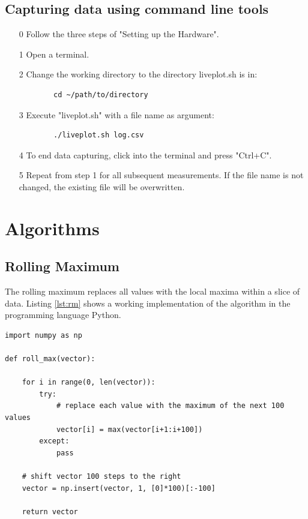 \subsection*{Capturing data using command line tools}

\begin{itemize}
	\item[0] Follow the three steps of "Setting up the Hardware".
	\item[1] Open a terminal.
	\item[2] Change the working directory to the directory liveplot.sh is in:
	\begin{lstlisting}
		cd ~/path/to/directory
	\end{lstlisting}
	\item[3] Execute "liveplot.sh" with a file name as argument:
	\begin{lstlisting}
		./liveplot.sh log.csv
	\end{lstlisting}
	\item[4] To end data capturing, click into the terminal and press "Ctrl+C".
	\item[5] Repeat from step 1 for all subsequent measurements. If the file name is not changed, the existing file will be overwritten.
\end{itemize}

\newpage

\section{Algorithms}

\subsection*{Rolling Maximum} \label{rollmax}

The rolling maximum replaces all values with the local maxima within a slice of data. Listing \ref{lst:rm} shows a working implementation of the algorithm in the programming language Python.

\begin{lstlisting}[caption={Python implementation the rolling maximum algorithm.},label={lst:rm}]
import numpy as np

def roll_max(vector):

    for i in range(0, len(vector)):
        try:
            # replace each value with the maximum of the next 100 values
            vector[i] = max(vector[i+1:i+100])
        except:
            pass

    # shift vector 100 steps to the right
    vector = np.insert(vector, 1, [0]*100)[:-100]

    return vector
    
\end{lstlisting}

